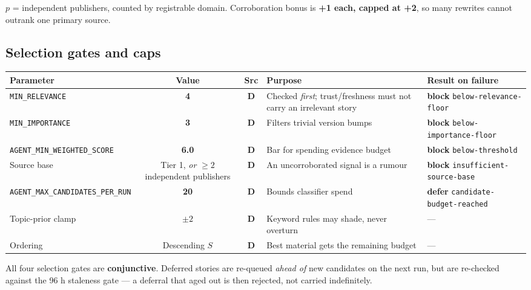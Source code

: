 \documentclass[10pt,a4paper]{article}
\newcommand{\vr}[1]{\texttt{\footnotesize\hyphenpenalty=0\exhyphenpenalty=0\relax #1}}
\newcommand{\cd}[1]{\texttt{\footnotesize\hyphenpenalty=0\exhyphenpenalty=0\relax #1}}
\newcommand{\us}{\_\discretionary{}{}{}}
\newcommand{\D}{\textcolor{go}{\textbf{D}}}
\newcommand{\BL}{\textcolor{st}{\textbf{block}}}
\newcommand{\DF}{\textcolor{hd}{\textbf{defer}}}
\begin{document}
$p$ = independent publishers, counted by registrable domain. Corroboration bonus is \textbf{+1 each, capped at +2}, so many rewrites cannot outrank one primary source.

\subsection{Selection gates and caps}

\begin{center}\footnotesize
\begin{tabularx}{\textwidth}{@{}>{\RaggedRight}p{3.6cm} c c >{\RaggedRight}X >{\RaggedRight}p{3.9cm}@{}}
\toprule
\textbf{Parameter} & \textbf{Value} & \textbf{Src} & \textbf{Purpose} & \textbf{Result on failure} \\
\midrule
\cd{MIN\us RELEVANCE} & \textbf{4} & \D & Checked \emph{first}; trust/freshness must not carry an irrelevant story & \BL{} \cd{below-relevance-floor} \\
\cd{MIN\us IMPORTANCE} & \textbf{3} & \D & Filters trivial version bumps & \BL{} \cd{below-importance-floor} \\
\vr{AGENT\us MIN\us WEIGHTED\us SCORE} & \textbf{6.0} & \D & Bar for spending evidence budget & \BL{} \cd{below-threshold} \\
Source base & Tier 1, \emph{or} $\geq 2$ independent publishers & \D & An uncorroborated signal is a rumour & \BL{} \cd{insufficient-}\allowbreak\cd{source-base} \\
\vr{AGENT\us MAX\us CANDIDATES\us PER\us RUN} & \textbf{20} & \D & Bounds classifier spend & \DF{} \cd{candidate-}\allowbreak\cd{budget-reached} \\
Topic-prior clamp & $\pm 2$ & \D & Keyword rules may shade, never overturn & --- \\
Ordering & Descending $S$ & \D & Best material gets the remaining budget & --- \\
\bottomrule
\end{tabularx}
\end{center}

\begin{note}\footnotesize
All four selection gates are \textbf{conjunctive}. Deferred stories are re-queued \emph{ahead of} new candidates on the next run, but are re-checked against the 96 h staleness gate --- a deferral that aged out is then rejected, not carried indefinitely.
\end{note}

\end{document}
